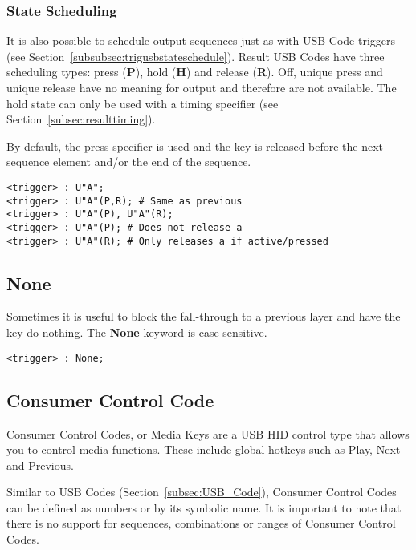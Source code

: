 \documentclass{kiibohd-template}
\begin{document}
\subsubsection{State Scheduling}
\label{subsubsec:resultusbcodestateschedule}

It is also possible to schedule output sequences just as with USB Code triggers (see Section~\ref{subsubsec:trigusbstateschedule}).
Result USB Codes have three scheduling types: press (\textbf{P}), hold (\textbf{H}) and release (\textbf{R}).
Off, unique press and unique release have no meaning for output and therefore are not available.
The hold state can only be used with a timing specifier (see Section~\ref{subsec:resulttiming}).

By default, the press specifier is used and the key is released before the next sequence element and/or the end of the sequence.

\begin{lstlisting}
<trigger> : U"A";
<trigger> : U"A"(P,R); # Same as previous
<trigger> : U"A"(P), U"A"(R);
<trigger> : U"A"(P); # Does not release a
<trigger> : U"A"(R); # Only releases a if active/pressed
\end{lstlisting}


\subsection{None}

Sometimes it is useful to block the fall-through to a previous layer and have the key do nothing.
The \textbf{None} keyword is case sensitive.

\begin{lstlisting}
<trigger> : None;
\end{lstlisting}


\subsection{Consumer Control Code}

Consumer Control Codes, or Media Keys are a USB HID control type that allows you to control media functions.
These include global hotkeys such as Play, Next and Previous.

Similar to USB Codes (Section~\ref{subsec:USB_Code}), Consumer Control Codes can be defined as numbers or by its symbolic name.
It is important to note that there is no support for sequences, combinations or ranges of Consumer Control Codes.
\end{document}
